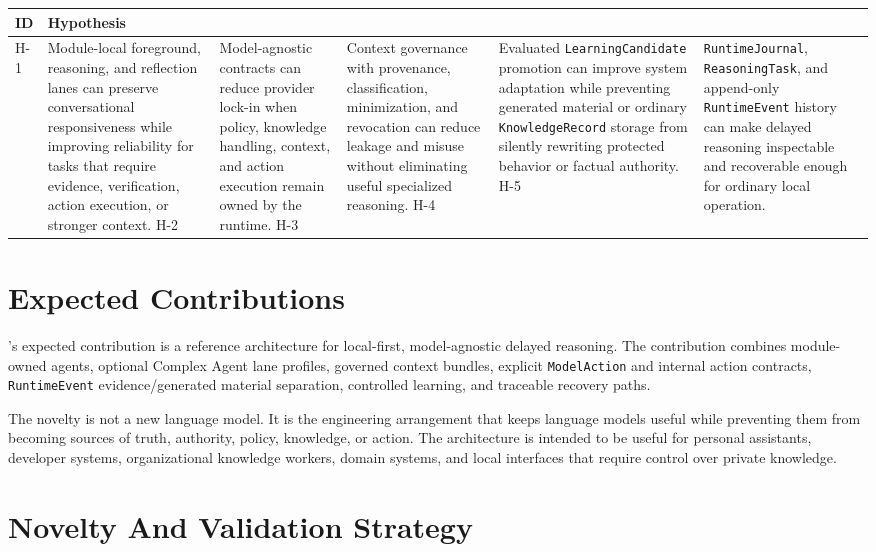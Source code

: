 \begin{tabularx}{.95\linewidth}{@{}lX@{}}
	\toprule
	\textbf{ID} & \textbf{Hypothesis} \\
	\midrule
	H-1 & Module-local foreground, reasoning, and reflection lanes can preserve conversational responsiveness while improving reliability for tasks that require evidence, verification, action execution, or stronger context. \n
	H-2 & Model-agnostic contracts can reduce provider lock-in when policy, knowledge handling, context, and action execution remain owned by the runtime. \n
	H-3 & Context governance with provenance, classification, minimization, and revocation can reduce leakage and misuse without eliminating useful specialized reasoning. \n
	H-4 & Evaluated \texttt{LearningCandidate} promotion can improve system adaptation while preventing generated material or ordinary \texttt{KnowledgeRecord} storage from silently rewriting protected behavior or factual authority. \n
	H-5 & \texttt{RuntimeJournal}, \texttt{ReasoningTask}, and append-only \texttt{RuntimeEvent} history can make delayed reasoning inspectable and recoverable enough for ordinary local operation. \n
	\bottomrule
\end{tabularx}

\section{Expected Contributions}

\Madre's expected contribution is a reference architecture for local-first, model-agnostic delayed reasoning. The contribution combines module-owned agents, optional Complex Agent lane profiles, governed context bundles, explicit \texttt{ModelAction} and internal action contracts, \texttt{RuntimeEvent} evidence/generated material separation, controlled learning, and traceable recovery paths.

The novelty is not a new language model. It is the engineering arrangement that keeps language models useful while preventing them from becoming sources of truth, authority, policy, knowledge, or action. The architecture is intended to be useful for personal assistants, developer systems, organizational knowledge workers, domain systems, and local interfaces that require control over private knowledge.

\section{Novelty And Validation Strategy}

